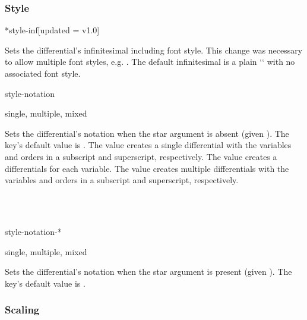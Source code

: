 	\subsubsection*{Style}
	
	\begin{option}*{style-inf}[updated = v1.0]
		\begin{values}[default = d]
		\end{values}
		Sets the differential's infinitesimal including font style. This change was necessary to allow multiple font styles, e.g. . The default infinitesimal is a plain `` with no associated font style.
	\end{option}
	
	\begin{option}{style-notation}
		\begin{values}[default = multiple]
			single, multiple, mixed
		\end{values}
		Sets the differential's notation when the star argument is absent (given ). The key's default value is . The value  creates a single differential with the variables and orders in a subscript and superscript, respectively. The value  creates a differentials for each variable. The value  creates multiple differentials with the variables and orders in a subscript and superscript, respectively.
		
		\begin{example}
			 \\
			 \\
		\end{example}
		
	\end{option}
	
	\begin{option}{style-notation-*}
		\begin{values}[default = single]
			single, multiple, mixed
		\end{values}
		Sets the differential's notation when the star argument is present (given ). The key's default value is .
	\end{option}
	
	\subsubsection*{Scaling}
	
